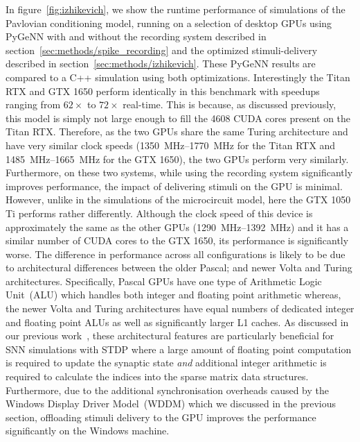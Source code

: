 \documentclass[utf8]{frontiersSCNS} %
\begin{document}
In figure~\ref{fig:izhikevich}, we show the runtime performance of simulations of the Pavlovian conditioning model, running on a selection of desktop GPUs using PyGeNN with and without the recording system described in section~\ref{sec:methods/spike_recording} and the optimized stimuli-delivery described in section~\ref{sec:methods/izhikevich}.
These PyGeNN results are compared to a C++ simulation using both optimizations.
Interestingly the Titan RTX and GTX 1650 perform identically in this benchmark with speedups ranging from $62\times$ to $72\times$ real-time.
This is because, as discussed previously, this model is simply not large enough to fill the \num{4608} CUDA cores present on the Titan RTX.
Therefore, as the two GPUs share the same Turing architecture and have very similar clock speeds (\SIrange{1350}{1770}{\mega\hertz} for the Titan RTX and \SIrange{1485}{1665}{\mega\hertz} for the GTX 1650), the two GPUs perform very similarly.
Furthermore, on these two systems, while using the recording system significantly improves performance, the impact of delivering stimuli on the GPU is minimal.
However, unlike in the simulations of the microcircuit model, here the GTX 1050 Ti performs rather differently. 
Although the clock speed of this device is approximately the same as the other GPUs (\SIrange{1290}{1392}{\mega\hertz}) and it has a similar number of CUDA cores to the GTX 1650, its performance is significantly worse.
The difference in performance across all configurations is likely to be due to architectural differences between the older Pascal; and newer Volta and Turing architectures.
Specifically, Pascal GPUs have one type of Arithmetic Logic Unit~(ALU) which handles both integer and floating point arithmetic whereas, the newer Volta and Turing architectures have equal numbers of dedicated integer and floating point ALUs as well as significantly larger L1 caches.
As discussed in our previous work~\citep{Knight2018}, these architectural features are particularly beneficial for SNN simulations with STDP where a large amount of floating point computation is required to update the synaptic state \emph{and} additional integer arithmetic is required to calculate the indices into the sparse matrix data structures.
Furthermore, due to the additional synchronisation overheads caused by the Windows Display Driver Model~(WDDM) which we discussed in the previous section, offloading stimuli delivery to the GPU improves the performance significantly on the Windows machine.
\end{document}
